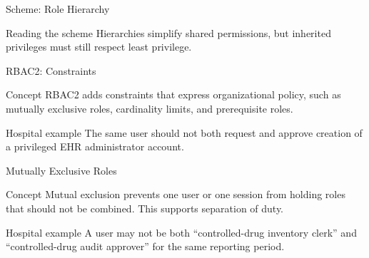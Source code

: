 \documentclass[presentation]{beamer}
\begin{document}
\begin{frame}[c]{Scheme: Role Hierarchy}
\begin{center}
\end{center}

\begin{block}{Reading the scheme}
Hierarchies simplify shared permissions, but inherited privileges must still respect least
privilege.
\end{block}
\end{frame}

\begin{frame}[c]{RBAC2: Constraints}
\begin{block}{Concept}
RBAC2 adds constraints that express organizational policy, such as mutually exclusive roles,
cardinality limits, and prerequisite roles.
\end{block}

\begin{exampleblock}{Hospital example}
The same user should not both request and approve creation of a privileged EHR administrator
account.
\end{exampleblock}
\end{frame}

\begin{frame}[c]{Mutually Exclusive Roles}
\begin{block}{Concept}
Mutual exclusion prevents one user or one session from holding roles that should not be combined.
This supports separation of duty.
\end{block}

\begin{exampleblock}{Hospital example}
A user may not be both ``controlled-drug inventory clerk'' and ``controlled-drug audit approver''
for the same reporting period.
\end{exampleblock}
\end{frame}
\end{document}
